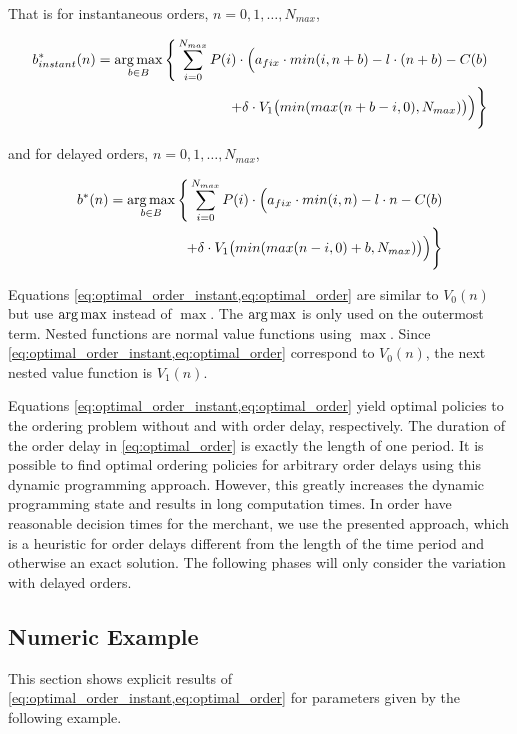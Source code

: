 That is for instantaneous orders, $n=0,1,\ldots,N_{max}$,

\begin{equation}
\begin{split}
b^*_{instant}(n) = \argmax_{b \in B} \Bigg\{
\sum_{i = 0}^{N_{max}}
P(i) \cdot \Big(
a_{fix} \cdot min(i, n + b) %
- l \cdot (n + b) %
- C(b) %
\\
+ \delta \cdot V_{1}\big(min(max(n + b - i, 0), N_{max})\big)
\Big)\Bigg\}
\end{split}
\label{eq:optimal_order_instant}
\end{equation}

and for delayed orders, $n=0,1,\ldots,N_{max}$,

\begin{equation}
\begin{split}
b^*(n) = \argmax_{b \in B} \Bigg\{
\sum_{i = 0}^{N_{max}} 
P(i) \cdot \Big(
a_{fix} \cdot min(i, n) %
- l \cdot n %
- C(b) %
 \\
+ \delta \cdot V_{1}\big(min(max(n - i, 0) + b, N_{max})\big)
\Big)\Bigg\}
\end{split}
\label{eq:optimal_order}
\end{equation}

Equations \cref{eq:optimal_order_instant,eq:optimal_order} are similar to $V_0(n)$ but use $\operatorname*{arg\,max}$ instead of $\max$. The $\operatorname*{arg\,max}$ is only used on the outermost term.
Nested functions are normal value functions using $\max$.
Since \cref{eq:optimal_order_instant,eq:optimal_order} correspond to $V_0(n)$, the next nested value function is $V_1(n)$.

Equations \cref{eq:optimal_order_instant,eq:optimal_order} yield optimal policies to the ordering problem without and with order delay, respectively.
The duration of the order delay in \cref{eq:optimal_order} is exactly the length of one period.
It is possible to find optimal ordering policies for arbitrary order delays using this dynamic programming approach.
However, this greatly increases the dynamic programming state and results in long computation times.
In order have reasonable decision times for the merchant, we use the presented approach, which is a heuristic for order delays different from the length of the time period and otherwise an exact solution.
The following phases will only consider the variation with delayed orders.

\subsection{Numeric Example}
\label{section:order_example}
This section shows explicit results of \cref{eq:optimal_order_instant,eq:optimal_order} for parameters given by the following example.

